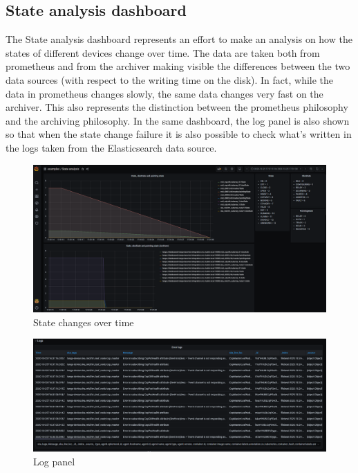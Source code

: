 \documentclass[]{spie}  %
\begin{document}
\subsection{State analysis dashboard}
The State analysis dashboard represents an effort to make an analysis on how the states of different devices change over time. The data are taken both from prometheus and from the archiver making visible the differences between the two data sources (with respect to the writing time on the disk). In fact, while the data in prometheus changes slowly, the same data changes very fast on the archiver. This also represents the distinction between the prometheus philosophy and the archiving philosophy.  
In the same dashboard, the log panel is also shown so that when the state change failure it is also possible to check what's written in the logs taken from the Elasticsearch data source. 

\begin{figure}[!htb]
   \centering
   \includegraphics*[width=0.6\columnwidth]{state_analysis}
       \caption{State changes over time}
   \label{fig:state_analysis}
\end{figure}

\begin{figure}[!htb]
   \centering
   \includegraphics*[width=0.6\columnwidth]{logs}
       \caption{Log panel}
   \label{fig:logs}
\end{figure}
\end{document}
